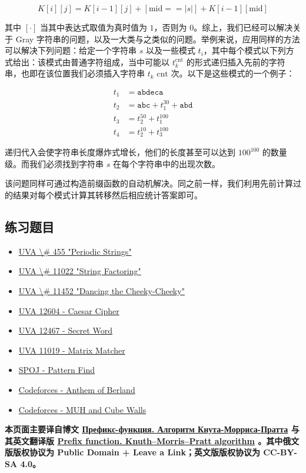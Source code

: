 $$
K[i][j] = K[i - 1][j] + [\text{mid} == |s|] + K[i - 1][\text{mid}]
$$

其中 $[\cdot]$ 当其中表达式取值为真时值为 $1$，否则为 $0$。综上，我们已经可以解决关于 Gray 字符串的问题，以及一大类与之类似的问题。举例来说，应用同样的方法可以解决下列问题：给定一个字符串 $s$ 以及一些模式 $t_i$，其中每个模式以下列方式给出：该模式由普通字符组成，当中可能以 $t_{k}^{\text{cnt}}$ 的形式递归插入先前的字符串，也即在该位置我们必须插入字符串 $t_k$ $\text{cnt}$ 次。以下是这些模式的一个例子：

$$
\begin{aligned}
t_1 &= \mathtt{abdeca} \\
t_2 &= \mathtt{abc} + t_1^{30} + \mathtt{abd} \\
t_3 &= t_2^{50} + t_1^{100} \\
t_4 &= t_2^{10} + t_3^{100}
\end{aligned}
$$

递归代入会使字符串长度爆炸式增长，他们的长度甚至可以达到 $100^{100}$ 的数量级。而我们必须找到字符串 $s$ 在每个字符串中的出现次数。

该问题同样可通过构造前缀函数的自动机解决。同之前一样，我们利用先前计算过的结果对每个模式计算其转移然后相应统计答案即可。

\subsection{练习题目}

\begin{itemize}
\item \href{http://uva.onlinejudge.org/index.php?option=onlinejudge&page=show_problem&problem=396}{UVA \textbackslash{}\# 455 "Periodic Strings"}
\item \href{http://uva.onlinejudge.org/index.php?option=onlinejudge&page=show_problem&problem=1963}{UVA \textbackslash{}\# 11022 "String Factoring"}
\item \href{http://uva.onlinejudge.org/index.php?option=onlinejudge&page=show_problem&problem=2447}{UVA \textbackslash{}\# 11452 "Dancing the Cheeky-Cheeky"}
\item \href{https://uva.onlinejudge.org/index.php?option=com_onlinejudge&Itemid=8&page=show_problem&problem=4282}{UVA 12604 - Caesar Cipher}
\item \href{https://uva.onlinejudge.org/index.php?option=com_onlinejudge&Itemid=8&page=show_problem&problem=3911}{UVA 12467 - Secret Word}
\item \href{https://uva.onlinejudge.org/index.php?option=onlinejudge&page=show_problem&problem=1960}{UVA 11019 - Matrix Matcher}
\item \href{http://www.spoj.com/problems/NAJPF/}{SPOJ - Pattern Find}
\item \href{http://codeforces.com/contest/808/problem/G}{Codeforces - Anthem of Berland}
\item \href{http://codeforces.com/problemset/problem/471/D}{Codeforces - MUH and Cube Walls}
\end{itemize}

\hr

\textbf{本页面主要译自博文 \href{http://e-maxx.ru/algo/prefix_function}{Префикс-функция. Алгоритм Кнута-Морриса-Пратта} 与其英文翻译版 \href{https://cp-algorithms.com/string/prefix-function.html}{Prefix function. Knuth–Morris–Pratt algorithm} 。其中俄文版版权协议为 Public Domain + Leave a Link；英文版版权协议为 CC-BY-SA 4.0。}

